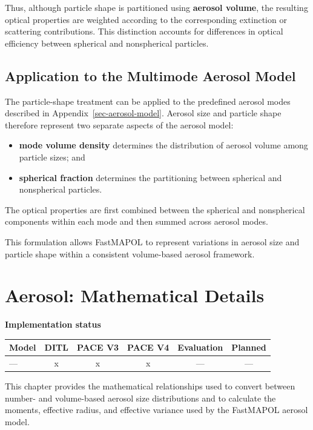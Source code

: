 \documentclass[
  11pt,
  letterpaper,
]{scrreprt}
\providecommand{\tightlist}{%
  \setlength{\itemsep}{0pt}\setlength{\parskip}{0pt}}
\begin{document}
Thus, although particle shape is partitioned using \textbf{aerosol
volume}, the resulting optical properties are weighted according to the
corresponding extinction or scattering contributions. This distinction
accounts for differences in optical efficiency between spherical and
nonspherical particles.

\section{Application to the Multimode Aerosol
Model}\label{application-to-the-multimode-aerosol-model}

The particle-shape treatment can be applied to the predefined aerosol
modes described in Appendix~\ref{sec-aerosol-model}. Aerosol size and
particle shape therefore represent two separate aspects of the aerosol
model:

\begin{itemize}
\tightlist
\item
  \textbf{mode volume density} determines the distribution of aerosol
  volume among particle sizes; and
\item
  \textbf{spherical fraction} determines the partitioning between
  spherical and nonspherical particles.
\end{itemize}

The optical properties are first combined between the spherical and
nonspherical components within each mode and then summed across aerosol
modes.

This formulation allows FastMAPOL to represent variations in aerosol
size and particle shape within a consistent volume-based aerosol
framework.

\chapter{Aerosol: Mathematical Details}\label{sec-aerosol-model-math}

\textbf{Implementation status}

\begin{longtable}[]{@{}lccccc@{}}
\toprule\noalign{}
Model & DITL & PACE V3 & PACE V4 & Evaluation & Planned \\
\midrule\noalign{}
\endhead
\bottomrule\noalign{}
\endlastfoot
--- & x & x & x & --- & --- \\
\end{longtable}

This chapter provides the mathematical relationships used to convert
between number- and volume-based aerosol size distributions and to
calculate the moments, effective radius, and effective variance used by
the FastMAPOL aerosol model.
\end{document}
